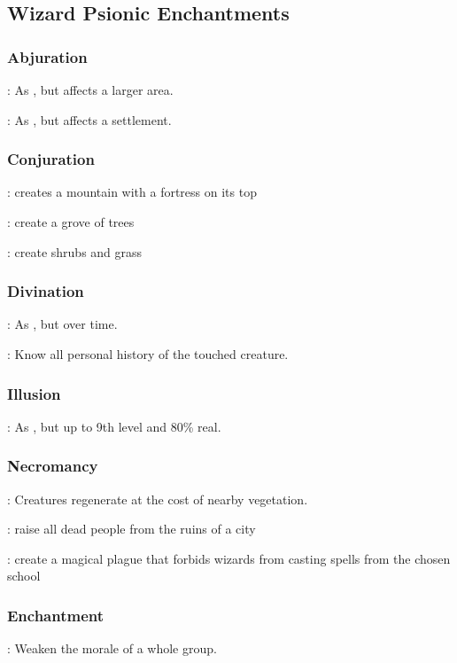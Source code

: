 \subsection{Wizard Psionic Enchantments}
\subsubsection{Abjuration}
: As , but affects a larger area.

: As , but affects a settlement.


\subsubsection{Conjuration}
: creates a mountain with a fortress on its top

: create a grove of trees

: create shrubs and grass


\subsubsection{Divination}
: As , but over time.

: Know all personal history of the touched creature.


\subsubsection{Illusion}
: As , but up to 9th level and 80\% real.


\subsubsection{Necromancy}
: Creatures regenerate at the cost of nearby vegetation.

: raise all dead people from the ruins of a city

: create a magical plague that forbids wizards from casting spells from the chosen school


\subsubsection{Enchantment}
: Weaken the morale of a whole group.

